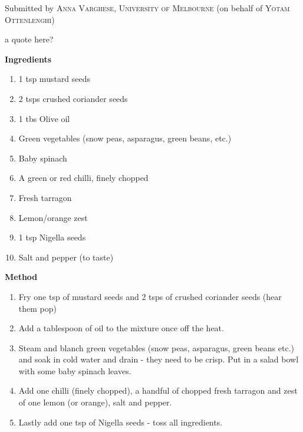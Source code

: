 

Submitted by \textsc{Anna Varghese, University of Melbourne} (on behalf of \textsc{Yotam Ottenlenghi})


\begin{shadequote*}
a quote here?
\end{shadequote*}
\hrulefill

\textbf{Ingredients}

\begin{enumerate}[before=\itshape,font=\normalfont]
\item 1 tsp mustard seeds
\item 2 tsps crushed coriander seeds
\item 1 tbs Olive oil
\item Green vegetables (snow peas, asparagus, green beans, etc.)
\item Baby spinach
\item A green or red chilli, finely chopped
\item Fresh tarragon
\item Lemon\slash orange zest
\item 1 tsp Nigella seeds
\item Salt and pepper (to taste)
\end{enumerate}

\hrulefill

\textbf{Method}

\begin{enumerate}
\item Fry one tsp of mustard seeds and 2 tsps of crushed coriander seeds (hear them pop) 
\item Add a tablespoon of oil to the mixture once off the heat. 
\item Steam and blanch green vegetables (snow peas, asparagus, green beans etc.) and soak in cold water and drain - they need to be crisp. Put in a salad bowl with some baby spinach leaves.  
\item Add one chilli (finely chopped), a handful of chopped fresh tarragon and zest of one lemon (or orange), salt and pepper. 
\item Lastly add one tsp of Nigella seeds - toss all ingredients. 
\end{enumerate}




\vfill
\pagebreak


